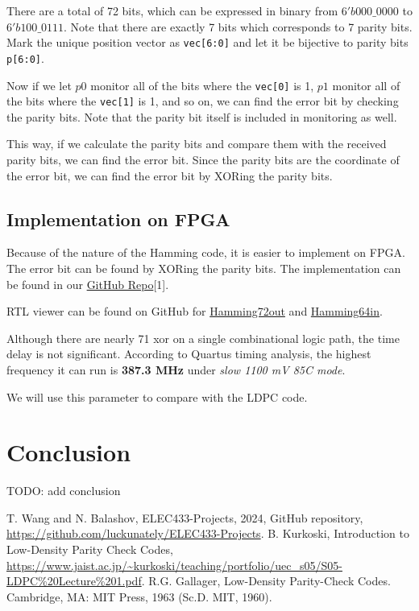 \documentclass[conference]{IEEEtran}
\begin{document}
There are a total of 72 bits, which can be expressed in binary from
$6'b000\_0000$ to $6'b 100\_0111$. Note that there are exactly 7 bits which
corresponds to 7 parity bits. Mark the unique position vector as
\texttt{vec[6:0]} and let it be bijective to parity bits \texttt{p[6:0]}.

Now if we let $p0$ monitor all of the bits where the \texttt{vec[0]} is 1, $p1$
monitor all of the bits where the \texttt{vec[1]} is 1, and so on, we can find
the error bit by checking the parity bits. Note that the parity bit itself is
included in monitoring as well.

This way, if we calculate the parity bits and compare them with the received
parity bits, we can find the error bit. Since the parity bits are the
coordinate of the error bit, we can find the error bit by XORing the parity
bits.
\subsection{Implementation on FPGA}
Because of the nature of the Hamming code, it is easier to implement on FPGA.
The error bit can be found by XORing the parity bits. The implementation can be
found in our \href{https://github.com/luckunately/ELEC433-Projects}{GitHub
  Repo}[1]. %

  RTL viewer can be found on GitHub for \href{https://github.com/luckunately/ELEC433-Projects/blob/add-tex/Hamming72out/Hamming72out_RTL.pdf}{Hamming72out} and \href{https://github.com/luckunately/ELEC433-Projects/blob/add-tex/Hamming64in/Hamming64inRTL.pdf}{Hamming64in}.

Although there are nearly 71 xor on a single combinational logic path, the time
delay is not significant. According to Quartus timing analysis, the highest
frequency it can run is \textbf{387.3 MHz} under \textit{slow 1100 mV 85C
  mode}.

We will use this parameter to compare with the LDPC code.

\section{Conclusion}
TODO: add conclusion

\begin{thebibliography}{00}
   T. Wang and N. Balashov, ELEC433-Projects, 2024, GitHub repository, \url{https://github.com/luckunately/ELEC433-Projects}.
   B. Kurkoski, Introduction to Low-Density Parity Check Codes, \url{https://www.jaist.ac.jp/~kurkoski/teaching/portfolio/uec_s05/S05-LDPC%20Lecture%201.pdf}.
   R.G. Gallager, Low-Density Parity-Check Codes. Cambridge, MA: MIT Press, 1963 (Sc.D. MIT, 1960).
\end{thebibliography}
\end{document}
